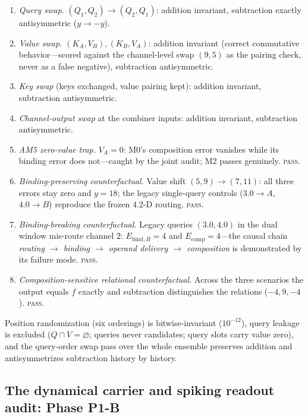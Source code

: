 \begin{enumerate}[leftmargin=*,noitemsep,topsep=1pt]
\item \emph{Query swap.} $(Q_1,Q_2)\to(Q_2,Q_1)$: addition invariant,
subtraction exactly antisymmetric ($y\to-y$).
\item \emph{Value swap.} $(K_A,V_B),(K_B,V_A)$: addition invariant
(correct commutative behavior---scored against the channel-level swap
$(9,5)$ as the pairing check, never as a false negative), subtraction
antisymmetric.
\item \emph{Key swap} (keys exchanged, value pairing kept): addition
invariant, subtraction antisymmetric.
\item \emph{Channel-output swap} at the combiner inputs: addition
invariant, subtraction antisymmetric.
\item \emph{AM5 zero-value trap.} $V_A=0$: M0's composition error
vanishes while its binding error does not---caught by the joint audit;
M2 passes genuinely. \textsc{pass}.
\item \emph{Binding-preserving counterfactual.} Value shift
$(5,9)\to(7,11)$: all three errors stay zero and $y=18$; the legacy
single-query controls ($3.0\to A$, $4.0\to B$) reproduce the frozen 4.2-D
routing. \textsc{pass}.
\item \emph{Binding-breaking counterfactual.} Legacy queries $(3.0,4.0)$
in the dual window mis-route channel 2:
$E_{\mathrm{bind},B}=4$ and $E_{\mathrm{comp}}=4$---the causal chain
\emph{routing $\to$ binding $\to$ operand delivery $\to$ composition} is
demonstrated by its failure mode. \textsc{pass}.
\item \emph{Composition-sensitive relational counterfactual.} Across the
three scenarios the output equals $f$ exactly and subtraction
distinguishes the relations ($-4,9,-4$). \textsc{pass}.
\end{enumerate}

Position randomization (six orderings) is bitwise-invariant ($10^{-12}$),
query leakage is excluded ($Q\cap V=\varnothing$; queries never
candidates; query slots carry value zero), and the query-order swap pass
over the whole ensemble preserves addition and antisymmetrizes subtraction
history by history.

\enlargethispage{2.5\baselineskip}
\subsection{The dynamical carrier and spiking readout audit: Phase P1-B}
\label{sec:carrier_audit}

